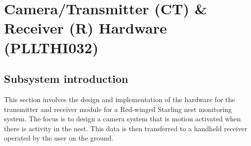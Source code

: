 %
%
%
\chapter{Camera/Transmitter (CT) \& Receiver (R) Hardware (PLLTHI032)\label{ch:firmware}}


\section{Subsystem introduction}
This section involves the design and implementation of the hardware for the transmitter and receiver module for a Red-winged Starling nest monitoring system. The focus is to design a camera system that is motion activated when there is activity in the nest. This data is then transferred to a handheld receiver operated by the user on the ground. 

